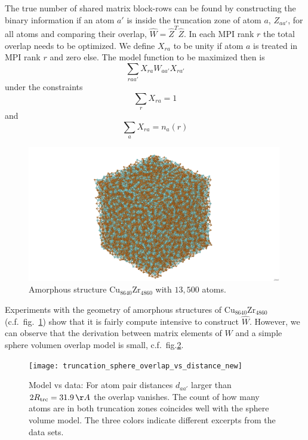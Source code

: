 \documentclass[a4paper]{article}
\newcommand{\MPIrank}{MPI rank} %
\newcommand{\um}[1]{_{\mathrm{#1}}}
\begin{document}
The true number of shared matrix block-rows can be found by constructing the binary information
if an atom $a'$ is inside the truncation zone of atom $a$, $Z_{aa'}$, 
for all atoms and comparing their overlap, $\hat W = \hat Z^T \hat Z$.
In each \MPIrank{} $r$ the total overlap needs to be optimized.
We define $X_{ra}$ to be unity if atom $a$ is treated in \MPIrank{} $r$ and zero else.
The model function to be maximized then is 
$$ \sum_{raa'} X_{ra} W_{aa'} X_{ra'} $$
under the constraints
$$ \sum_{r} X_{ra} = 1 $$
and
$$ \sum_{a} X_{ra} = n_{a}(r) $$

\begin{figure}[h!]
\begin{center}
  \includegraphics[width=0.99\textwidth]{Cu8640Zr4860}
  \caption{Amorphous structure $\mathrm{Cu}_{8640}\mathrm{Zr}_{4860}$ with $13,500$ atoms.}
\end{center}
\label{fig:Cu8640Zr4860_jmol}
\end{figure}

Experiments with the geometry of amorphous structures of 
$\mathrm{Cu}_{8640}\mathrm{Zr}_{4860}$ (c.f.~fig.~\ref{fig:Cu8640Zr4860_jmol})
show that it is fairly compute intensive to construct $\hat W$.
However, we can observe that the derivation between matrix elements of $W$ and a simple
sphere volumen overlap model is small, c.f.~fig.\ref{fig:truncation_sphere_overlap_vs_distance}.

\begin{figure}[h!]
\begin{center}
  \texttt{[image: truncation\_sphere\_overlap\_vs\_distance\_new]}
  \caption{Model vs data:
  For atom pair distances $d_{aa'}$ larger than $2R\um{trc} = 31.9\,\AA$ the overlap vanishes.
  The count of how many atoms are in both truncation zones coincides well with the sphere volume model.
  The three colors indicate different excerpts from the data sets.
  }
\end{center}
\label{fig:truncation_sphere_overlap_vs_distance}
\end{figure}
\end{document}
